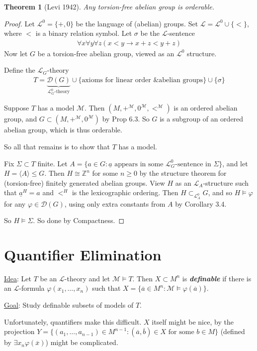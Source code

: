 \documentclass[]{article}
\theoremstyle{custhm}
\newtheorem{theorem}{Theorem}[section]
\theoremstyle{cusdef}
\theoremstyle{custhm}
\theoremstyle{custhm}
\theoremstyle{custhm}
\theoremstyle{ex}
\theoremstyle{custhm}
\theoremstyle{cusdef}
\theoremstyle{remark}
\newcommand{\Z}{\mathbb{Z}}
\newcommand{\ra}{\rightarrow}
\newcommand{\undf}[1]{\textit{\textbf{#1}}}
\renewcommand{\L}{\mathcal{L}}
\newcommand{\M}{\mathcal{M}}
\renewcommand{\phi}{\varphi}
\renewcommand{\bar}{\overline}
\newcommand{\D}{\mathcal{D}}
\begin{document}
\begin{theorem}[Levi 1942]
Any torsion-free abelian group is orderable.
\end{theorem}
\begin{proof}
Let $\L^0 = \{+,0\}$ be the language of (abelian) groups. Set $\L = \L^0 \cup\{<\}$, where $<$ is a binary relation symbol. Let $\sigma$ be the $\L$-sentence
\begin{align*}
\forall x \forall y\forall z ( x< y \ra x + z < y + z)
\end{align*}
Now let $G$ be a torsion-free abelian group, viewed as an $\L^0$ structure.

Define the $\L_G$-theory
\begin{align*}
T = \underbrace{\D(G)}_{\L_G^0\textrm{-theory}}\cup\{\textrm{axioms for linear order \& abelian groups}\}\cup\{\sigma\}
\end{align*}

Suppose $T$ has a model $\M$. Then $(M,+^\M,0^\M,<^\M)$ is an ordered abelian group, and $G\subset (M,+^\M,0^\M)$ by Prop 6.3. So $G$ is a subgroup of an ordered abelian group, which is thus orderable.

So all that remains is to show that $T$ has a model.

Fix $\Sigma \subset T$ finite. Let $A = \{a\in G: \underline{a}\textrm{ appears in some }\L_G^0\textrm{-sentence in }\Sigma\}$, and let $H = \langle A\rangle \le G$. Then $H\cong \Z^n$ for some $n\ge 0$ by the structure theorem for (torsion-free) finitely generated abelian groups. View $H$ as an $\L_A$-structure such that $\underline{a}^H = a$ and $<^H$ is the lexicographic ordering. Then $H\subset_{\L_A^0} G$, and so $H\models \phi$ for any $\phi \in \D(G)$, using only extra constants from $A$ by Corollary 3.4.

So $H\models \Sigma$. So done by Compactness.
\end{proof}


\section{Quantifier Elimination}

\underline{Idea}: Let $T$ be an $\L$-theory and let $\M\models T$. Then $X\subset M^n$ is \undf{definable} if there is an $\L$-formula $\phi(x_1,\dots,x_n)$ such that $X = \{\bar{a}\in M^n : \M\models \phi(\bar{a})\}$.

\underline{Goal}: Study definable subsets of models of $T$.

Unfortunately, quantifiers make this difficult. $X$ itself might be nice, by the projection $Y = \{(a_1,\dots,a_{n-1})\in M^{n-1}:(\bar{a},\bar{b})\in X\textrm{ for some }b\in M\}$ (defined by $\exists x_n \phi(\bar{x})$) might be complicated.
\end{document}

